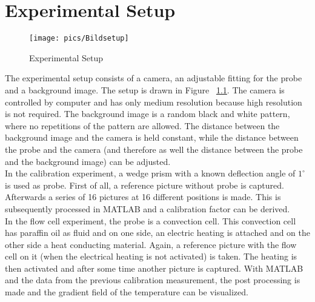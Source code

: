 \chapter{Experimental Setup}\label{sec:experimentalsetup}

\begin{figure}[H]
\texttt{[image: pics/Bildsetup]}
\caption{Experimental Setup}
\label{pic:Bildsetup}
\end{figure}

The experimental setup consists of a camera, an adjustable fitting for the probe and a background image. The setup is drawn in Figure ~\ref{pic:Bildsetup}. The camera is controlled by computer and has only medium resolution because high resolution is not required. The background image is a random black and white pattern, where no repetitions of the pattern are allowed. The distance between the background image and the camera is held constant, while the distance between the probe and the camera (and therefore as well the distance between the probe and the background image) can be adjusted. \\

In the calibration experiment, a wedge prism with a known deflection angle of $1^\circ\text{}$ is used as probe. First of all, a reference picture without probe is captured. Afterwards a series of 16 pictures at 16 different positions is made. This is subsequently processed in MATLAB and a calibration factor can be derived.\\

In the flow cell experiment, the probe is a convection cell. This convection cell has paraffin oil as fluid and on one side, an electric heating is attached and on the other side a heat conducting material. Again, a reference picture with the flow cell on it (when the electrical heating is not activated) is taken. The heating is then activated and after some time another picture is captured. With MATLAB and the data from the previous calibration measurement, the post processing is made and the gradient field of the temperature can be visualized.
